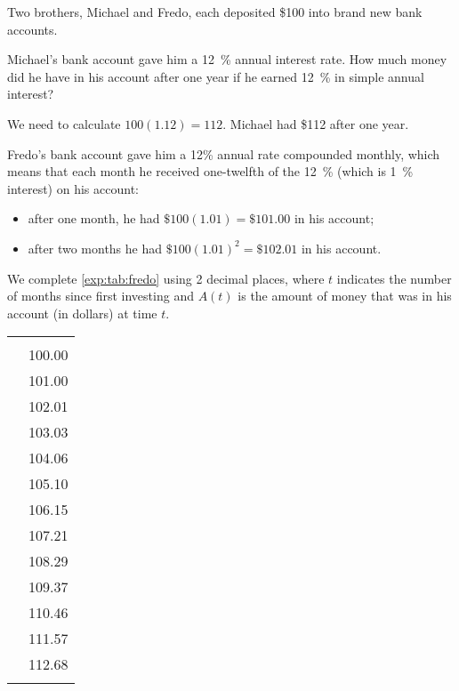 \begin{pccexample}
	Two brothers, Michael and Fredo, each deposited \$100 into brand new bank accounts.
										
	Michael's bank account gave him a \SI{12}{\percent} annual interest rate. 
	How much money did he have in his account after one year if he earned 
	\SI{12}{\percent} in simple annual interest?
										
	We need to calculate $100(1.12) = 112$. Michael had \$112 after one year.
										
	Fredo's bank account gave him a 12\% annual rate compounded monthly, 
	which means that each month he received one-twelfth of the \SI{12}{\percent} (which is 
	\SI{1}{\percent} interest) on his account:
	\begin{itemize}
		\item after one month, he had $\$100(1.01)=\$101.00$ in his account;
		\item after two months he had $\$100(1.01)^2=\$102.01$ in his account.
	\end{itemize}
	We complete \cref{exp:tab:fredo} using 
	2 decimal places, where $t$ indicates the number of months
	since first investing and $A(t)$ is the amount of money that was in his account (in 
	dollars) at time $t$. 
										
	\begin{margintable}
		\centering
		\begin{tabular}{S[table-format=2.0]S[table-format=3.2]}
			\beforeheading
			 &  \\
			             & 100.00           \\             & 101.00           \\             & 102.01           \\             & 103.03           \\             & 104.06           \\             & 105.10           \\             & 106.15           \\             & 107.21           \\             & 108.29           \\             & 109.37           \\            & 110.46           \\            & 111.57           \\            & 112.68           \\\lastline
		\end{tabular}
		\label{exp:tab:fredo}
	\end{margintable}
										

\end{pccexample}
